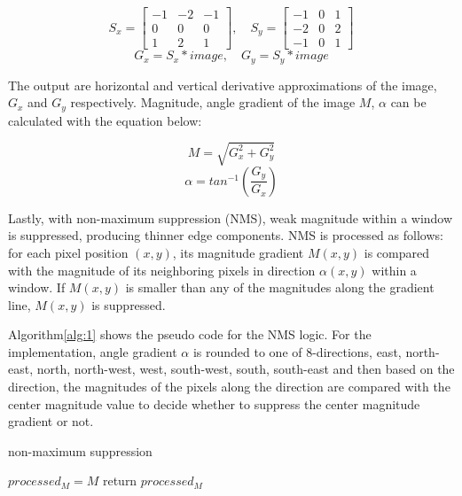 \documentclass[extendedabs]{bmvc2k}
\begin{document}
\[S_x = \begin{bmatrix}-1 & -2 & -1\\ 0 & 0 & 0\\ 1 & 2 & 1\end{bmatrix} , \quad
S_y = \begin{bmatrix}-1 & 0 & 1\\ -2 & 0 & 2\\ -1 & 0 & 1\end{bmatrix}\]
\[G_x = S_x \ast image , \quad G_y = S_y \ast image\]

The output are horizontal and vertical derivative approximations of the image, $G_x$ and $G_y$ respectively. 
Magnitude, angle gradient of the image $M$, $\alpha$ can be calculated with the equation below:

\[M = \sqrt{G_x^2 + G_y^2}\]
\[\alpha = tan^{-1}(\frac{G_y}{G_x})\]

Lastly, with non-maximum suppression (NMS), weak magnitude within a window is suppressed, producing thinner edge components.
NMS is processed as follows: for each pixel position $(x,y)$, its magnitude gradient $M(x,y)$ is compared with the magnitude of
its neighboring pixels in direction $\alpha(x,y)$ within a window. If $M(x,y)$ is smaller than any of the magnitudes along the
gradient line, $M(x,y)$ is suppressed.

Algorithm\ref{alg:1} shows the pseudo code for the NMS logic. For the implementation, angle gradient $\alpha$ is rounded to
one of 8-directions, east, north-east, north, north-west, west, south-west, south, south-east and then based on the direction,
the magnitudes of the pixels along the direction are compared with the center magnitude value to decide whether to suppress the
center magnitude gradient or not.

\begin{algorithm}
    \caption{non-maximum suppression}
    \label{alg:1}
    $processed_M = M$\;
    return $processed_M$\;
\end{algorithm}
\end{document}
